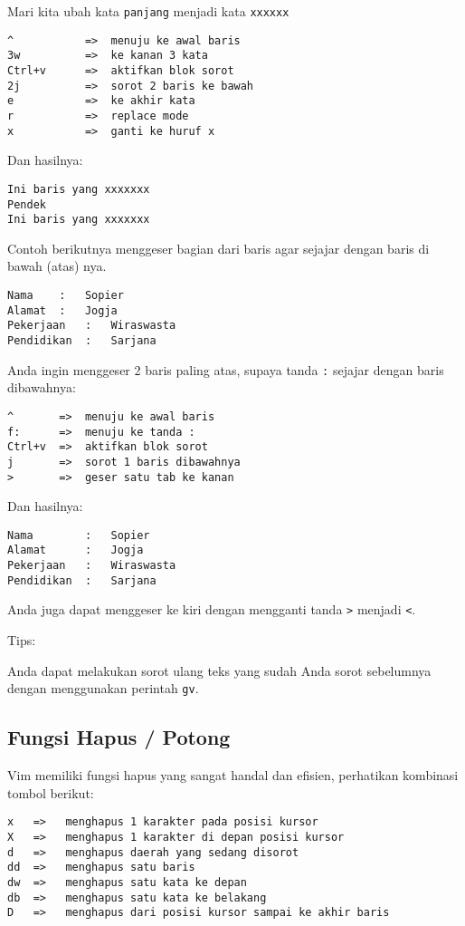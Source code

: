 \documentclass{article}
\begin{document}
Mari kita ubah kata \verb=panjang= menjadi kata
\verb=xxxxxx=

\begin{verbatim}
^           =>  menuju ke awal baris
3w          =>  ke kanan 3 kata
Ctrl+v      =>  aktifkan blok sorot
2j          =>  sorot 2 baris ke bawah
e           =>  ke akhir kata
r           =>  replace mode
x           =>  ganti ke huruf x
\end{verbatim}

Dan hasilnya:

\begin{verbatim}
Ini baris yang xxxxxxx
Pendek
Ini baris yang xxxxxxx
\end{verbatim}

Contoh berikutnya menggeser bagian dari baris agar sejajar
dengan baris di bawah (atas) nya.

\begin{verbatim}
Nama    :   Sopier
Alamat  :   Jogja
Pekerjaan   :   Wiraswasta
Pendidikan  :   Sarjana
\end{verbatim}

Anda ingin menggeser 2 baris paling atas, supaya tanda
\verb=:= sejajar dengan baris dibawahnya:

\begin{verbatim}
^       =>  menuju ke awal baris
f:      =>  menuju ke tanda :
Ctrl+v  =>  aktifkan blok sorot
j       =>  sorot 1 baris dibawahnya
>       =>  geser satu tab ke kanan
\end{verbatim}

Dan hasilnya:

\begin{verbatim}
Nama        :   Sopier
Alamat      :   Jogja
Pekerjaan   :   Wiraswasta
Pendidikan  :   Sarjana
\end{verbatim}

Anda juga dapat menggeser ke kiri dengan mengganti tanda
\verb=>= menjadi \verb=<=.

Tips:

Anda dapat melakukan sorot ulang teks yang sudah Anda sorot
sebelumnya dengan menggunakan perintah \verb=gv=.

\subsection{Fungsi Hapus / Potong}

Vim memiliki fungsi hapus yang sangat handal dan efisien,
perhatikan kombinasi tombol berikut:

\begin{verbatim}
x   =>   menghapus 1 karakter pada posisi kursor
X   =>   menghapus 1 karakter di depan posisi kursor
d   =>   menghapus daerah yang sedang disorot
dd  =>   menghapus satu baris
dw  =>   menghapus satu kata ke depan
db  =>   menghapus satu kata ke belakang
D   =>   menghapus dari posisi kursor sampai ke akhir baris
\end{verbatim}
\end{document}
